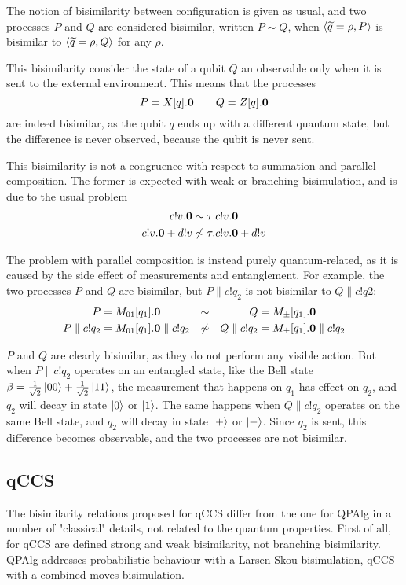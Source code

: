 The notion of bisimilarity between configuration is given as usual, and two processes $P$ and $Q$ are considered bisimilar, written $P \sim Q$, when $\langle\widetilde{q} = \rho, P\rangle$ is bisimilar to $\langle\widetilde{q} = \rho, Q\rangle$ for any $\rho$.

This bisimilarity consider the state of a qubit $Q$ an observable only when it is sent to the external environment. This means that the processes 
\[ P = X[q].\mathbf{0} \qquad Q = Z[q].\mathbf{0}\]
are indeed bisimilar, as the qubit $q$ ends up with a different quantum state, but the difference is never observed, because the qubit is never sent.

This bisimilarity is not a congruence with respect to summation and parallel composition. The former is expected with weak or branching bisimulation, and is due to the usual problem 
\begin{align*}
c!v.\mathbf{0} &\sim \tau.c!v.\mathbf{0} \\
c!v.\mathbf{0} + d!v &\not\sim \tau.c!v.\mathbf{0} + d!v
\end{align*}

The problem with parallel composition is instead purely quantum-related, as it is caused by the side effect of measurements and entanglement. For example, the two processes $P$ and $Q$ are bisimilar, but $P\parallel c!q_2$ is not bisimilar to $Q \parallel c!q2$:
\begin{align*}
 P &= M_{01}[q_1].\mathbf{0} &\sim & & Q &= M_\pm[q_1].\mathbf{0} \\ 
 P \parallel c!q_2 &=  M_{01}[q_1].\mathbf{0} \parallel c!q_2 &\not\sim & & Q \parallel c!q_2 &=  M_\pm[q_1].\mathbf{0} \parallel c!q_2 
\end{align*} 

$P$ and $Q$ are clearly bisimilar, as they do not perform any visible action. But when $P\parallel c!q_2$ operates on an entangled state, like the Bell state $\beta = \frac{1}{\sqrt{2}}\ket{00} + \frac{1}{\sqrt{2}}\ket{11}$, the measurement that happens on $q_1$ has effect on $q_2$, and $q_2$ will decay in state $\ket{0}$ or $\ket{1}$. The same happens when $Q\parallel c!q_2$ operates on the same Bell state, and $q_2$ will decay in state $\ket{+}$ or $\ket{-}$. Since $q_2$ is sent, this difference becomes observable, and the two processes are not bisimilar.

\subsection{qCCS}

The bisimilarity relations proposed for qCCS differ from the one for QPAlg in a number of "classical" details, not related to the quantum properties. First of all, for qCCS are defined strong and weak bisimilarity, not branching bisimilarity. QPAlg addresses probabilistic behaviour with a Larsen-Skou bisimulation, qCCS with a combined-moves bisimulation.

